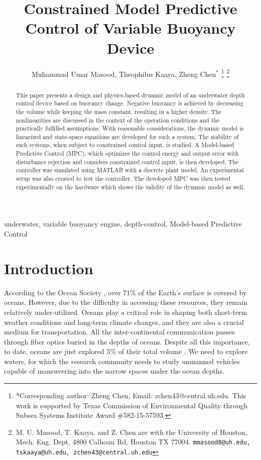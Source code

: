 \documentclass[conference, letterpaper]{IEEEtran}
\title{\LARGE \bf
Constrained Model Predictive Control of Variable Buoyancy Device}
\author{Muhammad Umar Masood, Theophilus Kaaya, Zheng Chen$^{*}$
\thanks{*Corresponding author: Zheng Chen, Email: zchen43@central.uh.edu. This work is supported by Texas Commission of Environmental Quality through Subsea Systems Institute Award \#582-15-57593. }%
\thanks{M. U. Masood, T. Kaaya, and Z. Chen are with the University of Houston, Mech. Eng. Dept, 4800 Calhoun Rd, Houston TX 77004.
        {\tt\small mmasood8@uh.edu, tskaaya@uh.edu, zchen43@central.uh.edu}}
}
\begin{document}
\maketitle

\thispagestyle{empty}
\pagestyle{empty}

\begin{abstract}
    This paper presents a design and physics-based dynamic model of an underwater depth control device based on buoyancy change. Negative buoyancy is achieved by decreasing the volume while keeping the mass constant, resulting in a higher density. The nonlinearities are discussed in the context of the operation conditions and the practically fulfilled assumptions. With reasonable considerations, the dynamic model is linearized and state-space equations are developed for such a system. The stability of such systems, when subject to constrained control input, is studied.  A Model-based Predictive Control (MPC), which optimizes the control energy and output error with disturbance rejection and considers constrained control input, is then developed. The controller was simulated using MATLAB with a discrete plant model. An experimental setup was also created to test the controller. The developed MPC was then tested experimentally on the hardware which shows the validity of the dynamic model as well.
\end{abstract}

\begin{IEEEkeywords}
    underwater, variable buoyancy engine, depth-control, Model-based Predictive Control
\end{IEEEkeywords}

\section{Introduction}
According to the Ocean Society \cite{OceanSociety}, over 71\% of the Earth's surface is covered by oceans. However, due to the difficulty in accessing these resources, they remain relatively under-utilized. Oceans play a critical role in shaping both short-term weather conditions and long-term climate changes, and they are also a crucial medium for transportation. All the inter-continental communication passes through fiber optics buried in the depths of oceans. Despite all this importance, to date, oceans are just explored 5$\%$ of their total volume \cite{USDepartmentofCommerce2014HowExplored}. We need to explore waters,  for which the research community needs to study unmanned vehicles capable of maneuvering into the narrow spaces under the ocean depths.
\end{document}
